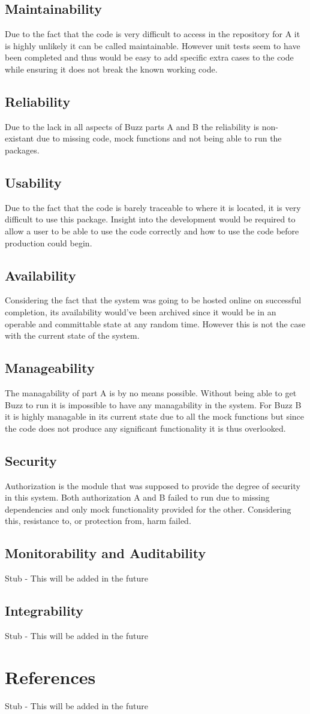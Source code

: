 \documentclass[12pt]{article}
\begin{document}
\subsection{Maintainability}
Due to the fact that the code is very difficult to access in the repository for A it is highly unlikely it can be called maintainable. However unit tests seem to have been completed and thus would be easy to add specific extra cases to the code while ensuring it does not break the known working code.
\subsection{Reliability}
Due to the lack in all aspects of Buzz parts A and B the reliability is non-existant due to missing code, mock functions and not being able to run the packages.
\subsection{Usability}
Due to the fact that the code is barely traceable to where it is located, it is very difficult to use this package. Insight into the development would be required to allow a user to be able to use the code correctly and how to use the code before production could begin.
\subsection{Availability}
Considering the fact that the system was going to be hosted online on successful completion, its availability would've been archived since it would be in an operable and committable state at any random time. However this is not the case with the current state of the system.

\subsection{Manageability}
The managability of part A is by no means possible. Without being able to get Buzz to run it is impossible to have any managability in the system. For Buzz B it is highly managable in its current state due to all the mock functions but since the code does not produce any significant functionality it is thus overlooked.
\subsection{Security}
Authorization is the module that was supposed to provide the degree of security in this system. Both authorization A and B  failed to run due to missing dependencies and only mock functionality provided for the other. Considering this, resistance to, or protection from, harm failed.
\subsection{Monitorability and Auditability}
Stub - This will be added in the future
\subsection{Integrability}
Stub - This will be added in the future

\section{References}
Stub - This will be added in the future
\end{document}

